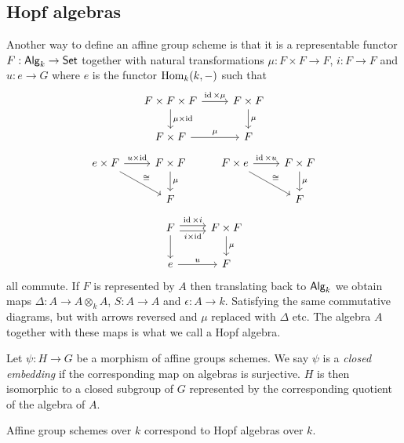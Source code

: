 \documentclass{memoir}
\begin{document}
\subsection{Hopf algebras}
Another way to define an affine group scheme is that it is a representable functor $F:{\normalfont\mathsf{Alg}}_k \to {\normalfont\mathsf{Set}}$ together with natural transformations $\mu:F\times F\to F$, $i:F\to F$ and $u:e\to G$ where $e$ is the functor $\operatorname{Hom}_k(k,-)$ such that
\begin{equation}
    \begin{tikzcd}
        F\times F\times F \arrow[r,"\id\times\mu"] \arrow[d,"\mu\times\id"] & F\times F \arrow[d,"\mu"] \\
        F\times F \arrow[r,"\mu"] & F
    \end{tikzcd}
\end{equation}
\begin{equation}
    \begin{tikzcd}
        e\times F \arrow[r,"u\times\id"] \arrow[dr,"\cong"] & F\times F \arrow[d,"\mu"] & F\times e \arrow[r,"\id\times u"] \arrow[dr,"\cong"] & F\times F \arrow[d,"\mu"] \\
                                                            & F & & F
    \end{tikzcd}
\end{equation}
\begin{equation}
    \begin{tikzcd}
        F \arrow[r,shift right,swap,"i\times\id"] \arrow[r,shift left,"\id\times i"] \arrow[d] & F\times F \arrow[d,"\mu"] \\
        e \arrow[r,"u"] & F
    \end{tikzcd}
\end{equation}
all commute.
If $F$ is represented by $A$ then translating back to ${\normalfont\mathsf{Alg}}_k$ we obtain maps $\Delta:A\to A\otimes_k A$, $S:A\to A$ and $\epsilon:A\to k$.
Satisfying the same commutative diagrams, but with arrows reversed and $\mu$ replaced with $\Delta$ etc.
The algebra $A$ together with these maps is what we call a Hopf algebra.
\begin{definition}
    Let $\psi:H\to G$ be a morphism of affine groups schemes. 
    We say $\psi$ is a \textit{closed embedding} if the corresponding map on algebras is surjective.
    $H$ is then isomorphic to a closed subgroup of $G$ represented by the corresponding quotient of the algebra of $A$.
\end{definition}
\begin{theorem}
    Affine group schemes over $k$ correspond to Hopf algebras over $k$.
\end{theorem}
\end{document}
